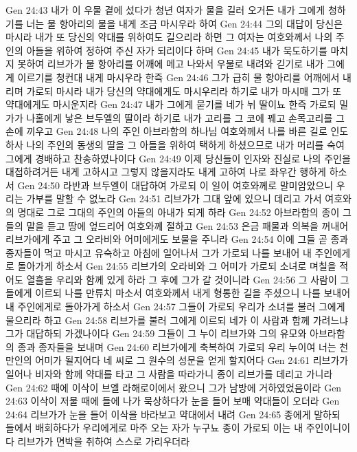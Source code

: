 Gen 24:43  내가 이 우물 곁에 섰다가 청년 여자가 물을 길러 오거든 내가 그에게 청하기를 너는 물 항아리의 물을 내게 조금 마시우라 하여
Gen 24:44  그의 대답이 당신은 마시라 내가 또 당신의 약대를 위하여도 길으리라 하면 그 여자는 여호와께서 나의 주인의 아들을 위하여 정하여 주신 자가 되리이다 하며
Gen 24:45  내가 묵도하기를 마치지 못하여 리브가가 물 항아리를 어깨에 메고 나와서 우물로 내려와 긷기로 내가 그에게 이르기를 청컨대 내게 마시우라 한즉
Gen 24:46  그가 급히 물 항아리를 어깨에서 내리며 가로되 마시라 내가 당신의 약대에게도 마시우리라 하기로 내가 마시매 그가 또 약대에게도 마시운지라
Gen 24:47  내가 그에게 묻기를 네가 뉘 딸이뇨 한즉 가로되 밀가가 나홀에게 낳은 브두엘의 딸이라 하기로 내가 고리를 그 코에 꿰고 손목고리를 그 손에 끼우고
Gen 24:48  나의 주인 아브라함의 하나님 여호와께서 나를 바른 길로 인도하사 나의 주인의 동생의 딸을 그 아들을 위하여 택하게 하셨으므로 내가 머리를 숙여 그에게 경배하고 찬송하였나이다
Gen 24:49  이제 당신들이 인자와 진실로 나의 주인을 대접하려거든 내게 고하시고 그렇지 않을지라도 내게 고하여 나로 좌우간 행하게 하소서
Gen 24:50  라반과 브두엘이 대답하여 가로되 이 일이 여호와께로 말미암았으니 우리는 가부를 말할 수 없노라
Gen 24:51  리브가가 그대 앞에 있으니 데리고 가서 여호와의 명대로 그로 그대의 주인의 아들의 아내가 되게 하라
Gen 24:52  아브라함의 종이 그들의 말을 듣고 땅에 엎드리어 여호와께 절하고
Gen 24:53  은금 패물과 의복을 꺼내어 리브가에게 주고 그 오라비와 어미에게도 보물을 주니라
Gen 24:54  이에 그들 곧 종과 종자들이 먹고 마시고 유숙하고 아침에 일어나서 그가 가로되 나를 보내어 내 주인에게로 돌아가게 하소서
Gen 24:55  리브가의 오라비와 그 어미가 가로되 소녀로 며칠을 적어도 열흘을 우리와 함께 있게 하라 그 후에 그가 갈 것이니라
Gen 24:56  그 사람이 그들에게 이르되 나를 만류치 마소서 여호와께서 내게 형통한 길을 주셨으니 나를 보내어 내 주인에게로 돌아가게 하소서
Gen 24:57  그들이 가로되 우리가 소녀를 불러 그에게 물으리라 하고
Gen 24:58  리브가를 불러 그에게 이르되 네가 이 사람과 함께 가려느냐 그가 대답하되 가겠나이다
Gen 24:59  그들이 그 누이 리브가와 그의 유모와 아브라함의 종과 종자들을 보내며
Gen 24:60  리브가에게 축복하여 가로되 우리 누이여 너는 천만인의 어미가 될지어다 네 씨로 그 원수의 성문을 얻게 할지어다
Gen 24:61  리브가가 일어나 비자와 함께 약대를 타고 그 사람을 따라가니 종이 리브가를 데리고 가니라
Gen 24:62  때에 이삭이 브엘 라해로이에서 왔으니 그가 남방에 거하였었음이라
Gen 24:63  이삭이 저물 때에 들에 나가 묵상하다가 눈을 들어 보매 약대들이 오더라
Gen 24:64  리브가가 눈을 들어 이삭을 바라보고 약대에서 내려
Gen 24:65  종에게 말하되 들에서 배회하다가 우리에게로 마주 오는 자가 누구뇨 종이 가로되 이는 내 주인이니이다 리브가가 면박을 취하여 스스로 가리우더라
